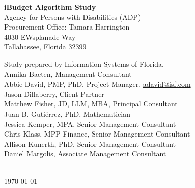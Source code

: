 \begin{flushleft}

\phantom{ghost text}

\vspace{\fill}

\noindent \textbf{iBudget Algorithm Study} \\
Agency for Persons with Disabilities (ADP) \\
Procurement Office: Tamara Harrington \\
4030 EWsplanade Way \\
Tallahassee, Florida 32399

\vspace{1cm}

\noindent Study prepared by Information Systems of Florida. \\
Annika Baeten, Management Consultant \\
Abbie David, PMP, PhD, Project Manager. \href{mailto:adavid@isf.com}{adavid@isf.com}\\
Jason Dillaberry, Client Partner \\
Matthew Fisher, JD, LLM, MBA, Principal Consultant \\
Juan B. Gutiérrez, PhD, Mathematician \\
Jessica Kemper, MPA, Senior Management Consultant \\
Chris Klass, MPP Finance, Senior Management Consultant \\
Allison Kunerth, PhD, Senior Management Consultant \\
Daniel Margolis, Associate Management Consultant \\



\vspace{0.5in}

\noindent \TheAuthor \\
\today
\end{flushleft}


\newpage



\tableofcontents

\newpage


